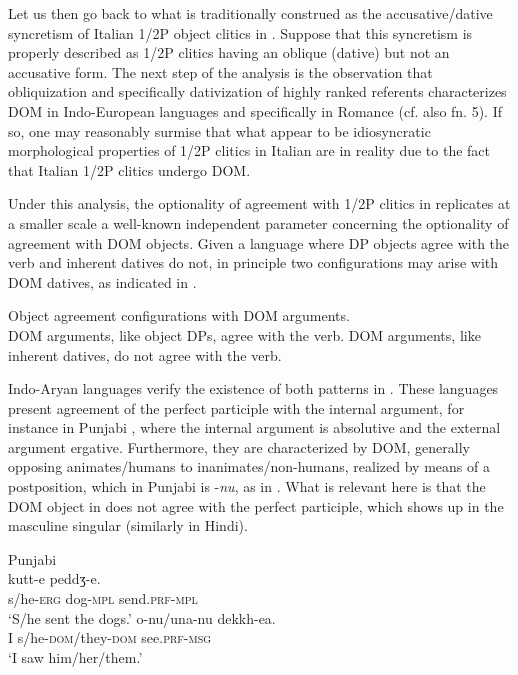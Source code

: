 \documentclass[output=paper,colorlinks,citecolor=brown,modfonts,nonflat]{langsci/langscibook}
\begin{document}
Let us then go back to what is traditionally construed as the accusative/dative syncretism of Italian 1/2P object clitics in .  Suppose that this syncretism is properly described as 1/2P clitics having an oblique (dative) but not an accusative form. The next step of the analysis is the observation that obliquization and specifically dativization of highly ranked referents characterizes DOM in Indo-European languages and specifically in Romance (cf. also fn. 5).  If so, one may reasonably surmise that what appear to be idiosyncratic morphological properties of 1/2P clitics in Italian are in reality due to the fact that Italian 1/2P clitics undergo DOM.

Under this analysis, the optionality of agreement with 1/2P clitics in  replicates at a smaller scale a well-known independent parameter concerning the optionality of agreement with DOM objects. Given a language where DP objects agree with the verb and inherent datives do not, in principle two configurations may arise with DOM datives, as indicated in .

\ea%
    \label{ex:manzini:17}
    Object agreement configurations with DOM arguments. \\
    \ea\label{ex:manzini:17a}
    DOM arguments, like object DPs, agree with the verb.
    \ex\label{ex:manzini:17b}
    DOM arguments, like inherent datives, do not agree with the verb.
    \z
\z

\largerpage[-1]
Indo-Aryan languages verify the existence of both patterns in . These languages present agreement of the perfect participle with the internal argument, for instance in Punjabi , where the internal argument is absolutive and the external argument ergative. Furthermore, they are characterized by DOM, generally opposing animates/humans to inanimates/non-humans, realized by means of a postposition, which in Punjabi is -\textit{nu}, as in . What is relevant here is that the DOM object in  does not agree with the perfect participle, which shows up in the masculine singular (similarly in Hindi).

\ea%
    \label{ex:manzini:18}
    Punjabi \citep{ManziniSavoiaFranco2015}\\
    \ea\label{ex:manzini:18a}
         {kutt-e}     {peddʒ-e}.\\
        s/he-\textsc{erg}   dog-\textsc{mpl}   send.\textsc{prf-mpl}\\
    \glt ‘S/he sent the dogs.’
    \ex\label{ex:manzini:18b}
       {o-nu/una-nu}       {dekkh-ea}.\\
        I   s/he\textsc{{}-dom}/they\textsc{{}-dom}    see.\textsc{prf-msg}\\
    \glt ‘I saw him/her/them.’
    \z
\z
\end{document}
